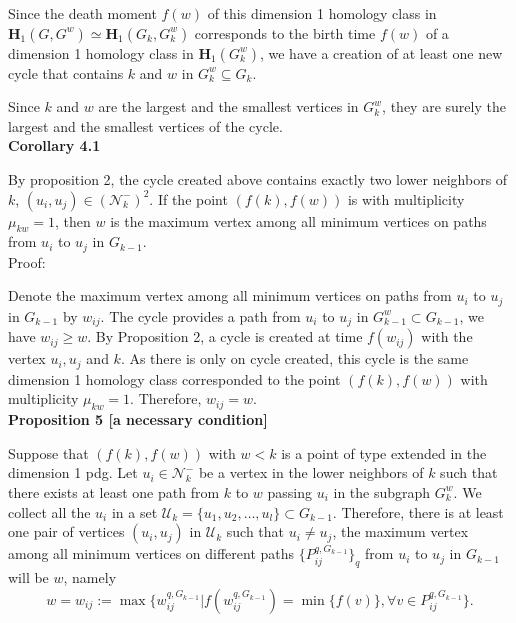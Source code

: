 \documentclass[a4paper,12pt]{article}
\numberwithin{equation}{section}
\begin{document}
	Since the death moment $f(w)$ of this dimension 1 homology class in $\mathbf{H}_1(G,G^w) \simeq \mathbf{H}_1(G_k,G_k^w)$ corresponds to the birth time $f(w)$ of a dimension 1 homology class in $\mathbf{H}_1(G_k^w)$, we have a creation of at least one new cycle that contains $k$ and $w$ in $G_k^w \subseteq G_k$. 
	
	Since $k$ and $w$ are the largest and the smallest vertices in $G_k^w$, they are surely the largest and the smallest vertices of the cycle. \\
	
	

	\noindent \textbf{Corollary 4.1} 
	
	By proposition 2, the cycle created above contains exactly two lower neighbors of $k$, $(u_i,u_j) \in (\mathcal{N}_k^-)^2$. 
	If the point $(f(k),f(w))$ is with multiplicity $\mu_{kw} = 1$, then $w$ is the maximum vertex among all minimum vertices on paths from $u_i$ to $u_j$ in $G_{k-1}$.\\ 
	
	\noindent Proof:
	
	Denote the maximum vertex among all minimum vertices on paths from $u_i$ to $u_j$ in $G_{k-1}$ by $w_{ij}$. 
	The cycle provides a path from $u_i$ to $u_j$ in $G^w_{k-1} \subset G_{k-1}$, we have $w_{ij} \geq w$.
	By Proposition 2, a cycle is created at time $f(w_{ij})$ with the vertex $u_i,u_j$ and $k$. As there is only on cycle created, this cycle is the same dimension 1 homology class corresponded to the point $(f(k), f(w))$ with multiplicity $\mu_{kw} = 1$. Therefore, $w_{ij} = w$.\\
	
	
	\noindent \textbf{Proposition 5 [a necessary condition]}
	
	Suppose that $(f(k), f(w))$ with $w < k$ is a point of type extended in the dimension 1 pdg. Let $u_i \in \mathcal{N}_k^-$ be a vertex in the lower neighbors of $k$ such that there exists at least one path from $k$ to $w$ passing $u_i$ in the subgraph $G_k^w$. We collect all the $u_i$ in a set $\mathcal{U}_k = \{ u_1,u_2,\ldots, u_l\} \subset G_{k-1}$. Therefore, there is at least one pair of vertices $(u_i, u_j)$ in $\mathcal{U}_k$ such that $u_i \neq u_j$, the maximum vertex among all minimum vertices on different paths $\{ P^{q,G_{k-1}}_{ij} \}_q$ from $u_i$ to $u_j$ in $G_{k-1}$ will be $w$, namely 
	$$w =w_{ij} := \max \{ w^{q,G_{k-1}}_{ij} \vert f(w^{q,G_{k-1}}_{ij}) = \min \{ f(v) \}, \forall v \in P^{q,G_{k-1}}_{ij}  \}.$$
	
\end{document}

